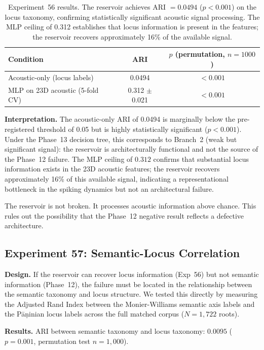 \documentclass{article}
\begin{document}
\begin{table}[h]
\centering
\begin{tabular}{lcc}
\toprule
Condition & ARI & $p$ (permutation, $n=1000$) \\
\midrule
Acoustic-only (locus labels) & 0.0494 & $< 0.001$ \\
MLP on 23D acoustic (5-fold CV) & 0.312 $\pm$ 0.021 & $< 0.001$ \\
\bottomrule
\end{tabular}
\caption{Experiment~56 results. The reservoir achieves ARI $= 0.0494$
  ($p < 0.001$) on the locus taxonomy, confirming statistically significant
  acoustic signal processing. The MLP ceiling of 0.312 establishes that
  locus information is present in the features; the reservoir recovers
  approximately 16\% of the available signal.}
\label{tab:exp56}
\end{table}

\textbf{Interpretation.} The acoustic-only ARI of 0.0494 is marginally
below the pre-registered threshold of 0.05 but is highly statistically
significant ($p < 0.001$). Under the Phase~13 decision tree, this
corresponds to Branch~2 (weak but significant signal): the reservoir is
architecturally functional and not the source of the Phase~12 failure.
The MLP ceiling of $0.312$ confirms that substantial locus information
exists in the 23D acoustic features; the reservoir recovers approximately
16\% of this available signal, indicating a representational bottleneck
in the spiking dynamics but not an architectural failure.

The reservoir is not broken. It processes acoustic information above
chance. This rules out the possibility that the Phase~12 negative result
reflects a defective architecture.

\subsection{Experiment 57: Semantic-Locus Correlation}

\textbf{Design.} If the reservoir can recover locus information (Exp~56)
but not semantic information (Phase~12), the failure must be located in
the relationship between the semantic taxonomy and locus structure. We
tested this directly by measuring the Adjusted Rand Index between the
Monier-Williams semantic axis labels and the Pāṇinian locus labels across
the full matched corpus ($N = 1{,}722$ roots).

\textbf{Results.} ARI between semantic taxonomy and locus taxonomy:
$0.0095$ ($p = 0.001$, permutation test $n = 1{,}000$).
\end{document}
